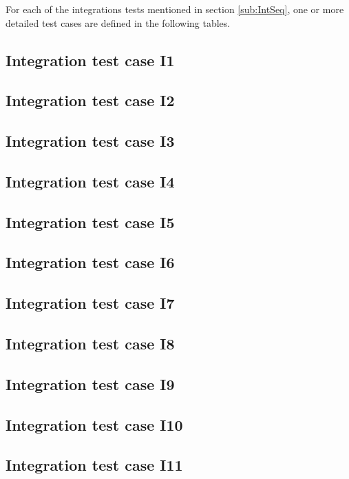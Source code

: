 For each of the integrations tests mentioned in section \ref{sub:IntSeq}, one or more detailed test cases are defined in the following tables.\\
\subsection{Integration test case I1}
\label{sub:IT1}

\subsection{Integration test case I2}
\label{sub:IT2}

\subsection{Integration test case I3}
\label{sub:IT3}

\subsection{Integration test case I4}
\label{sub:IT4}

\subsection{Integration test case I5}
\label{sub:IT5}

\subsection{Integration test case I6}
\label{sub:IT6}

\subsection{Integration test case I7}
\label{sub:IT7}

\subsection{Integration test case I8}
\label{sub:IT8}

\subsection{Integration test case I9}
\label{sub:IT9}

\subsection{Integration test case I10}
\label{sub:IT10}

\subsection{Integration test case I11}
\label{sub:IT11}